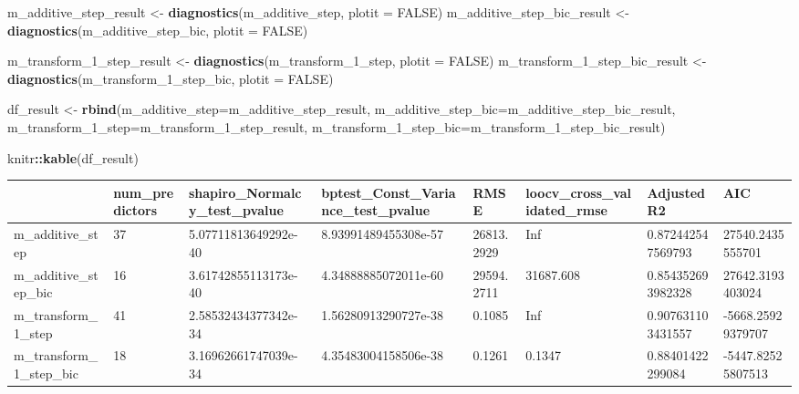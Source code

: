 \documentclass[
]{article}
\newenvironment{Shaded}{\begin{snugshade}}{\end{snugshade}}
\newcommand{\DataTypeTok}[1]{\textcolor[rgb]{0.13,0.29,0.53}{#1}}
\newcommand{\DecValTok}[1]{\textcolor[rgb]{0.00,0.00,0.81}{#1}}
\newcommand{\KeywordTok}[1]{\textcolor[rgb]{0.13,0.29,0.53}{\textbf{#1}}}
\newcommand{\NormalTok}[1]{#1}
\newcommand{\OperatorTok}[1]{\textcolor[rgb]{0.81,0.36,0.00}{\textbf{#1}}}
\newcommand{\OtherTok}[1]{\textcolor[rgb]{0.56,0.35,0.01}{#1}}
\newcommand{\StringTok}[1]{\textcolor[rgb]{0.31,0.60,0.02}{#1}}
\begin{document}
\begin{Shaded}
\begin{Highlighting}[]
\NormalTok{m_additive_step_result <-}\StringTok{ }\KeywordTok{diagnostics}\NormalTok{(m_additive_step, }\DataTypeTok{plotit =} \OtherTok{FALSE}\NormalTok{)}
\NormalTok{m_additive_step_bic_result <-}\StringTok{ }\KeywordTok{diagnostics}\NormalTok{(m_additive_step_bic, }\DataTypeTok{plotit =} \OtherTok{FALSE}\NormalTok{)}

\NormalTok{m_transform_}\DecValTok{1}\NormalTok{_step_result <-}\StringTok{ }\KeywordTok{diagnostics}\NormalTok{(m_transform_}\DecValTok{1}\NormalTok{_step, }\DataTypeTok{plotit =} \OtherTok{FALSE}\NormalTok{)}
\NormalTok{m_transform_}\DecValTok{1}\NormalTok{_step_bic_result <-}\StringTok{ }\KeywordTok{diagnostics}\NormalTok{(m_transform_}\DecValTok{1}\NormalTok{_step_bic, }\DataTypeTok{plotit =} \OtherTok{FALSE}\NormalTok{)}

\NormalTok{df_result <-}\StringTok{ }\KeywordTok{rbind}\NormalTok{(}\DataTypeTok{m_additive_step=}\NormalTok{m_additive_step_result, }\DataTypeTok{m_additive_step_bic=}\NormalTok{m_additive_step_bic_result, }\DataTypeTok{m_transform_1_step=}\NormalTok{m_transform_}\DecValTok{1}\NormalTok{_step_result, }\DataTypeTok{m_transform_1_step_bic=}\NormalTok{m_transform_}\DecValTok{1}\NormalTok{_step_bic_result)}
\end{Highlighting}
\end{Shaded}

\begin{Shaded}
\begin{Highlighting}[]
\NormalTok{knitr}\OperatorTok{::}\KeywordTok{kable}\NormalTok{(df_result)}
\end{Highlighting}
\end{Shaded}

\begin{tabular}{l|l|l|l|l|l|l|l}
\hline
  & num\_predictors & shapiro\_Normalcy\_test\_pvalue & bptest\_Const\_Variance\_test\_pvalue & RMSE & loocv\_cross\_validated\_rmse & AdjustedR2 & AIC\\
\hline
m\_additive\_step & 37 & 5.07711813649292e-40 & 8.93991489455308e-57 & 26813.2929 & Inf & 0.872442547569793 & 27540.2435555701\\
\hline
m\_additive\_step\_bic & 16 & 3.61742855113173e-40 & 4.34888885072011e-60 & 29594.2711 & 31687.608 & 0.854352693982328 & 27642.3193403024\\
\hline
m\_transform\_1\_step & 41 & 2.58532434377342e-34 & 1.56280913290727e-38 & 0.1085 & Inf & 0.907631103431557 & -5668.25929379707\\
\hline
m\_transform\_1\_step\_bic & 18 & 3.16962661747039e-34 & 4.35483004158506e-38 & 0.1261 & 0.1347 & 0.88401422299084 & -5447.82525807513\\
\hline
\end{tabular}
\end{document}
